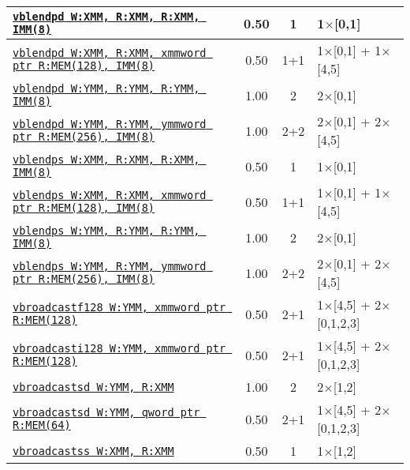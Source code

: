 \documentclass[a4paper,english,fontsize=9]{scrartcl}
\begin{document}
\begin{longtable}{p{}ccL{.25\textwidth}}
  \midrule
  \texttt{\href{https://felixcloutier.com/x86/BLENDPD.html}{vblendpd W:XMM, R:XMM, R:XMM, IMM(8)}} & 0.50 & 1 & 1\(\times\)[0,1] \\
  \midrule
  \texttt{\href{https://felixcloutier.com/x86/BLENDPD.html}{vblendpd W:XMM, R:XMM, xmmword ptr R:MEM(128), IMM(8)}} & 0.50 & 1+1 & 1\(\times\)[0,1] + 1\(\times\)[4,5] \\
  \midrule
  \texttt{\href{https://felixcloutier.com/x86/BLENDPD.html}{vblendpd W:YMM, R:YMM, R:YMM, IMM(8)}} & 1.00 & 2 & 2\(\times\)[0,1] \\
  \midrule
  \texttt{\href{https://felixcloutier.com/x86/BLENDPD.html}{vblendpd W:YMM, R:YMM, ymmword ptr R:MEM(256), IMM(8)}} & 1.00 & 2+2 & 2\(\times\)[0,1] + 2\(\times\)[4,5] \\
  \midrule
  \texttt{\href{https://felixcloutier.com/x86/BLENDPS.html}{vblendps W:XMM, R:XMM, R:XMM, IMM(8)}} & 0.50 & 1 & 1\(\times\)[0,1] \\
  \midrule
  \texttt{\href{https://felixcloutier.com/x86/BLENDPS.html}{vblendps W:XMM, R:XMM, xmmword ptr R:MEM(128), IMM(8)}} & 0.50 & 1+1 & 1\(\times\)[0,1] + 1\(\times\)[4,5] \\
  \midrule
  \texttt{\href{https://felixcloutier.com/x86/BLENDPS.html}{vblendps W:YMM, R:YMM, R:YMM, IMM(8)}} & 1.00 & 2 & 2\(\times\)[0,1] \\
  \midrule
  \texttt{\href{https://felixcloutier.com/x86/BLENDPS.html}{vblendps W:YMM, R:YMM, ymmword ptr R:MEM(256), IMM(8)}} & 1.00 & 2+2 & 2\(\times\)[0,1] + 2\(\times\)[4,5] \\
  \midrule
  \texttt{\href{https://felixcloutier.com/x86/VBROADCAST.html}{vbroadcastf128 W:YMM, xmmword ptr R:MEM(128)}} & 0.50 & 2+1 & 1\(\times\)[4,5] + 2\(\times\)[0,1,2,3] \\
  \midrule
  \texttt{\href{https://felixcloutier.com/x86/VBROADCAST.html}{vbroadcasti128 W:YMM, xmmword ptr R:MEM(128)}} & 0.50 & 2+1 & 1\(\times\)[4,5] + 2\(\times\)[0,1,2,3] \\
  \midrule
  \texttt{\href{https://felixcloutier.com/x86/VBROADCAST.html}{vbroadcastsd W:YMM, R:XMM}} & 1.00 & 2 & 2\(\times\)[1,2] \\
  \midrule
  \texttt{\href{https://felixcloutier.com/x86/VBROADCAST.html}{vbroadcastsd W:YMM, qword ptr R:MEM(64)}} & 0.50 & 2+1 & 1\(\times\)[4,5] + 2\(\times\)[0,1,2,3] \\
  \midrule
  \texttt{\href{https://felixcloutier.com/x86/VBROADCAST.html}{vbroadcastss W:XMM, R:XMM}} & 0.50 & 1 & 1\(\times\)[1,2] \\

\end{longtable}
\end{document}
